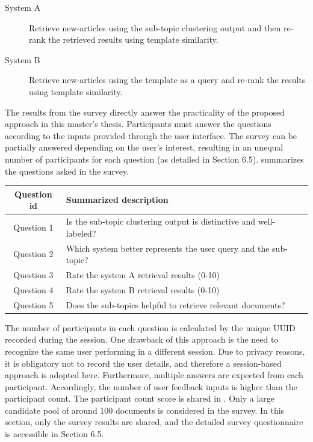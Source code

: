 \begin{description}
	\item[System A] Retrieve new-articles using the sub-topic clustering output and then re-rank the retrieved results using template similarity.
	
	\item[System B] Retrieve new-articles using the template as a query and re-rank the results using template similarity.
\end{description}

The results from the survey directly answer the practicality of the proposed approach in this master's thesis. Participants must answer the questions according to the inputs provided through the user interface. The survey can be partially answered depending on the user's interest, resulting in an unequal number of participants for each question (as detailed in Section 6.5).  summarizes the questions asked in the survey.


\begin{center}
	\label{tab:question_summarization}
	\begin{tabularx}{.8\textwidth}{|c|Y|}
		\hline
		Question id  & Summarized description \\
		\hline
		Question 1 & Is the sub-topic clustering output is distinctive and well-labeled?  \\
		\hline
		Question 2 & Which system better represents the user query and the sub-topic? \\
		\hline
		Question 3 & Rate the system A retrieval results (0-10) \\
		\hline
		Question 4 & Rate the system B retrieval results (0-10) \\
		\hline
		Question 5 &  Does the sub-topics helpful to retrieve relevant documents?\\
		\hline
	\end{tabularx}
\end{center}

The number of participants in each question is calculated by the unique UUID recorded during the session. One drawback of this approach is the need to recognize the same user performing in a different session. Due to privacy reasons, it is obligatory not to record the user details, and therefore a session-based approach is adopted here. Furthermore, multiple answers are expected from each participant. Accordingly, the number of user feedback inputs is higher than the participant count. The participant count score is shared in . Only a large candidate pool of around 100 documents is considered in the survey. In this section, only the survey results are shared, and the detailed survey questionnaire is accessible in Section 6.5.


